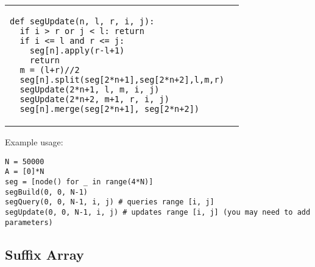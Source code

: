 \documentclass[letterpaper]{article}
\begin{document}
\begin{tabular}{@{}p{9.5cm}p{8.5cm}@{}}
\begin{lstlisting}
def segUpdate(n, l, r, i, j):
  if i > r or j < l: return
  if i <= l and r <= j:
    seg[n].apply(r-l+1)
    return
  m = (l+r)//2
  seg[n].split(seg[2*n+1],seg[2*n+2],l,m,r)
  segUpdate(2*n+1, l, m, i, j)
  segUpdate(2*n+2, m+1, r, i, j)
  seg[n].merge(seg[2*n+1], seg[2*n+2])
\end{lstlisting}
\end{tabular}

Example usage:
\begin{lstlisting}
N = 50000
A = [0]*N
seg = [node() for _ in range(4*N)]
segBuild(0, 0, N-1)
segQuery(0, 0, N-1, i, j) # queries range [i, j]
segUpdate(0, 0, N-1, i, j) # updates range [i, j] (you may need to add parameters)
\end{lstlisting}

\clearpage

\subsection{Suffix Array}
\end{document}
